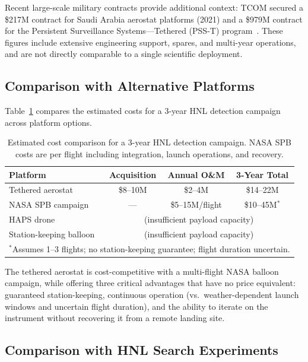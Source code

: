 \documentclass[11pt]{article}
\begin{document}
Recent large-scale military contracts provide additional context:
TCOM secured a \$217M contract for Saudi Arabia aerostat platforms
(2021) and a \$979M contract for the Persistent Surveillance
Systems---Tethered (PSS-T) program~\cite{TCOM-PSS-T}.  These figures
include extensive engineering support, spares, and multi-year
operations, and are not directly comparable to a single scientific
deployment.

\subsection{Comparison with Alternative Platforms}

Table~\ref{tab:cost} compares the estimated costs for a 3-year
HNL detection campaign across platform options.

\begin{table}[h]
\centering
\small
\begin{tabular}{lccc}
\toprule
\textbf{Platform} & \textbf{Acquisition} & \textbf{Annual O\&M} &
\textbf{3-Year Total} \\
\midrule
Tethered aerostat       & \$8--10M  & \$2--4M  & \$14--22M \\
NASA SPB campaign       & ---       & \$5--15M/flight & \$10--45M$^*$ \\
HAPS drone              & \multicolumn{3}{c}{(insufficient payload capacity)} \\
Station-keeping balloon & \multicolumn{3}{c}{(insufficient payload capacity)} \\
\bottomrule
\multicolumn{4}{l}{\footnotesize $^*$Assumes 1--3 flights;
no station-keeping guarantee; flight duration uncertain.}
\end{tabular}
\caption{Estimated cost comparison for a 3-year HNL detection campaign.
NASA SPB costs are per flight including integration, launch operations,
and recovery.}
\label{tab:cost}
\end{table}

The tethered aerostat is cost-competitive with a multi-flight NASA
balloon campaign, while offering three critical advantages that have
no price equivalent: guaranteed station-keeping, continuous operation
(vs.\ weather-dependent launch windows and uncertain flight duration),
and the ability to iterate on the instrument without recovering it
from a remote landing site.

\subsection{Comparison with HNL Search Experiments}
\end{document}
